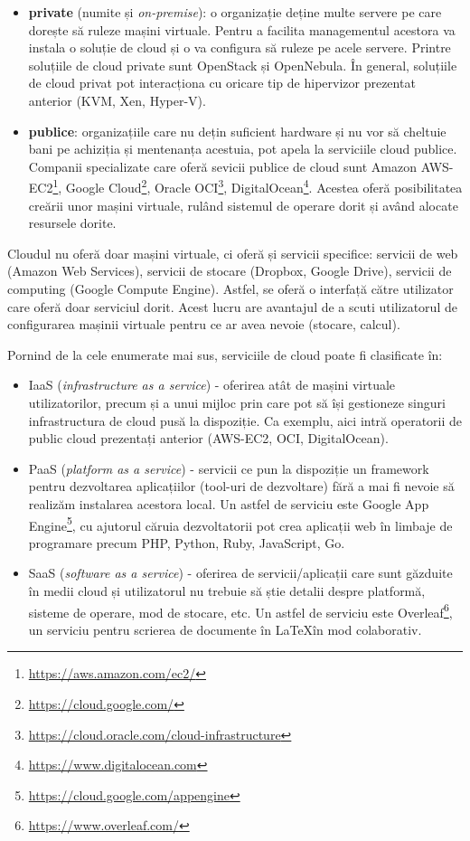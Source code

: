\begin{itemize}
  \item \textbf{private} (numite și \textit{on-premise}): o organizație deține multe servere pe care dorește să ruleze mașini virtuale.
    Pentru a facilita managementul acestora va instala o soluție de cloud și o va configura să ruleze pe acele servere.
    Printre soluțiile de cloud private sunt OpenStack și OpenNebula.
    În general, soluțiile de cloud privat pot interacționa cu oricare tip de hipervizor prezentat anterior (KVM, Xen, Hyper-V).
  \item \textbf{publice}: organizațiile care nu dețin suficient hardware și nu vor să cheltuie bani pe achiziția și mentenanța acestuia, pot apela la serviciile cloud publice.
    Companii specializate care oferă sevicii publice de cloud sunt Amazon AWS-EC2\footnote{\url{https://aws.amazon.com/ec2/}}, Google Cloud\footnote{\url{https://cloud.google.com/}}, Oracle OCI\footnote{\url{https://cloud.oracle.com/cloud-infrastructure}}, DigitalOcean\footnote{\url{https://www.digitalocean.com}}.
    Acestea oferă posibilitatea creării unor mașini virtuale, rulând sistemul de operare dorit și având alocate resursele dorite.
\end{itemize}

Cloudul nu oferă doar mașini virtuale, ci oferă și servicii specifice: servicii de web (Amazon Web Services), servicii de stocare (Dropbox, Google Drive), servicii de computing (Google Compute Engine).
Astfel, se oferă o interfață către utilizator care oferă doar serviciul dorit.
Acest lucru are avantajul de a scuti utilizatorul de configurarea mașinii virtuale pentru ce ar avea nevoie (stocare, calcul).

Pornind de la cele enumerate mai sus, serviciile de cloud poate fi clasificate în:

\begin{itemize}
  \item IaaS (\textit{infrastructure as a service}) - oferirea atât de mașini virtuale utilizatorilor, precum și a unui mijloc prin care pot să își gestioneze singuri infrastructura de cloud pusă la dispoziție.
    Ca exemplu, aici intră operatorii de public cloud prezentați anterior (AWS-EC2, OCI, DigitalOcean).
  \item PaaS (\textit{platform as a service}) - servicii ce pun la dispoziție un framework pentru dezvoltarea aplicațiilor (tool-uri de dezvoltare) fără a mai fi nevoie să realizăm instalarea acestora local.
    Un astfel de serviciu este Google App Engine\footnote{\url{https://cloud.google.com/appengine}}, cu ajutorul căruia dezvoltatorii pot crea aplicații web în limbaje de programare precum PHP, Python, Ruby, JavaScript, Go.
  \item SaaS (\textit{software as a service}) - oferirea de servicii/aplicații care sunt găzduite în medii cloud și utilizatorul nu trebuie să știe detalii despre platformă, sisteme de operare, mod de stocare, etc.
    Un astfel de serviciu este Overleaf\footnote{\url{https://www.overleaf.com/}}, un serviciu pentru scrierea de documente în \LaTeX  în mod colaborativ.
\end{itemize}

